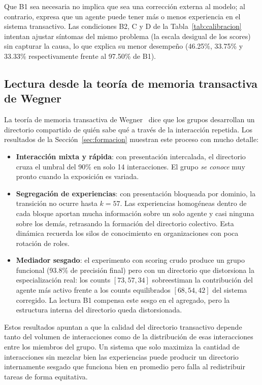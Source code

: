 Que B1 sea necesaria no implica que sea una corrección externa al modelo; al contrario, expresa que un agente puede tener más o menos experiencia en el sistema transactivo.
Las condiciones B2, C y D de la Tabla~\ref{tab:calibracion} intentan ajustar síntomas del mismo problema (la escala desigual de los scores) sin capturar la causa, lo que explica su menor desempeño (46.25\%, 33.75\% y 33.33\% respectivamente frente al 97.50\% de B1).

\subsection{Lectura desde la teoría de memoria transactiva de Wegner}
\label{sec:disc-wegner}

La teoría de memoria transactiva de Wegner~\cite{wegner1987transactive} dice que los grupos desarrollan un directorio compartido de quién sabe qué a través de la interacción repetida.
Los resultados de la Sección~\ref{sec:formacion} muestran este proceso con mucho detalle:

\begin{itemize}
    \item \textbf{Interacción mixta y rápida}: con presentación intercalada, el directorio cruza el umbral del 90\% en solo 14 interacciones.
    El grupo \textit{se conoce} muy pronto cuando la exposición es variada.
    \item \textbf{Segregación de experiencias}: con presentación bloqueada por dominio, la transición no ocurre hasta $k = 57$.
    Las experiencias homogéneas dentro de cada bloque aportan mucha información sobre un solo agente y casi ninguna sobre los demás, retrasando la formación del directorio colectivo.
    Esta dinámica recuerda los silos de conocimiento en organizaciones con poca rotación de roles.
    \item \textbf{Mediador sesgado}: el experimento con scoring crudo produce un grupo funcional (93.8\% de precisión final) pero con un directorio que distorsiona la especialización real: los counts $[73, 57, 34]$ sobreestiman la contribución del agente más activo frente a los counts equilibrados $[68, 54, 42]$ del sistema corregido.
    La lectura B1 compensa este sesgo en el agregado, pero la estructura interna del directorio queda distorsionada.
\end{itemize}

Estos resultados apuntan a que la calidad del directorio transactivo depende tanto del volumen de interacciones como de la distribución de esas interacciones entre los miembros del grupo.
Un sistema que solo maximiza la cantidad de interacciones sin mezclar bien las experiencias puede producir un directorio internamente sesgado que funciona bien en promedio pero falla al redistribuir tareas de forma equitativa.

